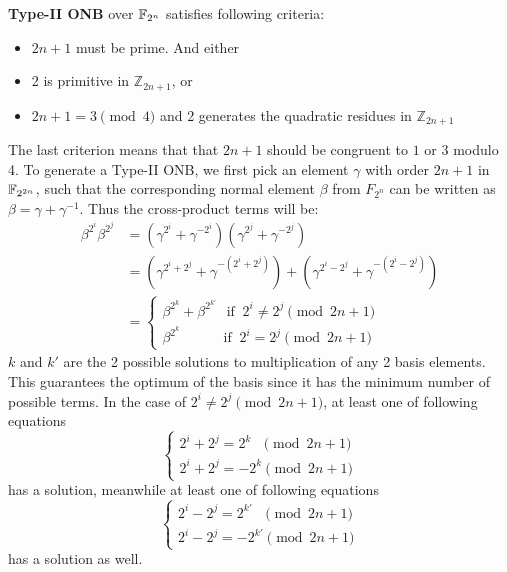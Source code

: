 {\bf Type-II ONB} over ${\mathbb{F}}_{2^n}$ satisfies following criteria:
\begin{itemize}
\item $2n+1$ must be prime. And either
\item 2 is primitive in $\mathbb{Z}_{2n+1}$, or
\item $2n+1 = 3 \pmod{4}$ and 2 generates the quadratic residues in $\mathbb{Z}_{2n+1}$
\end{itemize}
The last criterion means that that $2n+1$ should be congruent to $1$ or $3$ modulo 4. 
To generate a Type-II ONB, we first pick an element $\gamma$ with order $2n+1$ in ${\mathbb{F}}_{2^{2n}}$, 
such that the corresponding normal element $\beta$
from $F_{2^n}$ can be written as $\beta = \gamma + \gamma^{-1}$. Thus the cross-product terms will be:
\begin{equation}
\begin{split}
\beta^{2^i}\beta^{2^j} &= (\gamma^{2^i} + \gamma^{-2^i})(\gamma^{2^j} + \gamma^{-2^j})\\ &= 
(\gamma^{2^i+2^j} + \gamma^{-(2^i+2^j)}) + (\gamma^{2^i-2^j} + \gamma^{-(2^i-2^j)})\\ &= 
\begin{cases}
\beta^{2^k} + \beta^{2^{k\prime}}~~~\text{if }~ 2^i \neq 2^j \pmod{2n+1}\\
\beta^{2^k}~~~~~~~~~~~~~~\text{if }~ 2^i = 2^j \pmod{2n+1}
\end{cases}
\end{split}
\end{equation}
$k$ and $k\prime$ are the 2 possible solutions to multiplication of any 2 basis elements. 
This guarantees the optimum of the basis since it has the minimum number of possible terms. 
In the case of $2^i \neq 2^j \pmod{2n+1}$, at least one of following
equations
\begin{equation}
\label{eqn:app1st}
\begin{cases}
2^i + 2^j = 2^k ~~~\pmod{2n+1}\\
2^i + 2^j = -2^k \pmod{2n+1}
\end{cases}
\end{equation}
has a solution, meanwhile at least one of following equations
\begin{equation}
\label{eqn:app2nd}
\begin{cases}
2^i - 2^j = 2^{k\prime} ~~~\pmod{2n+1}\\
2^i - 2^j = -2^{k\prime} \pmod{2n+1}
\end{cases}
\end{equation}
has a solution as well.

